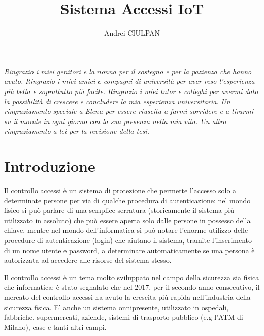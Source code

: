 \documentclass[12pt]{report}
\newcommand\blankpage{%
	\null
	\thispagestyle{empty}%
	\addtocounter{page}{-1}%
	\newpage}
\begin{document}
\title{Sistema Accessi IoT}
\author{Andrei CIULPAN}
\afterpage{\blankpage}
% 
%
\beforepreface

{\hfill \footnotesize {\sl Ringrazio i miei genitori e la nonna per il sostegno e per la pazienza che hanno avuto.}}
\vskip 0.8cm
{\hfill \footnotesize {\sl Ringrazio i miei amici e compagni di università per aver reso l'esperienza più bella e soprattutto più facile.}}
\vskip 0.8cm
{\hfill \footnotesize {\sl Ringrazio i miei tutor e colleghi per avermi dato la possibilità di crescere e concludere la mia esperienza universitaria.}}
\vskip 0.8cm
{\hfill \footnotesize {\sl Un ringraziamento speciale a Elena per essere riuscita a farmi sorridere e a tirarmi su il morale in ogni giorno con la sua presenza nella mia vita.  Un altro ringraziamento a lei per la revisione della tesi.}}
       

\afterpreface



\chapter{Introduzione}\label{cap:introduzione}
%

Il controllo accessi è un sistema di protezione che permette l'accesso solo a determinate persone per via di qualche procedura di autenticazione: nel mondo fisico si può parlare di una semplice serratura (storicamente il sistema più utilizzato in assoluto) che può essere aperta solo dalle persone in possesso della chiave, mentre nel mondo dell'informatica si può notare l'enorme utilizzo delle procedure di autenticazione (login) che aiutano il sistema, tramite l'inserimento di un nome utente e password, a determinare automaticamente se una persona è autorizzata ad accedere alle risorse del sistema stesso.

Il controllo accessi\cite{controllo_accessi} è un tema molto sviluppato nel campo della sicurezza sia fisica che informatica: è stato segnalato che nel 2017, per il secondo anno consecutivo, il mercato del controllo accessi ha avuto la crescita più rapida nell'industria della sicurezza fisica\cite{crescita_controllo_accessi}. E' anche un sistema onnipresente, utilizzato in ospedali, fabbriche, supermercati, aziende, sistemi di trasporto pubblico (e.g l'ATM di Milano), case e tanti altri campi.  
\end{document}
